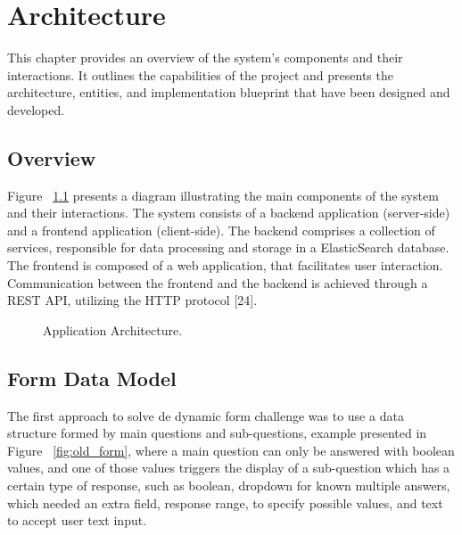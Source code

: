 %
%
\chapter{Architecture} \label{cap:architecture}

This chapter provides an overview of the system’s components and their interactions.
It outlines the capabilities of the project and presents the architecture, entities, and
implementation blueprint that have been designed and developed.

\section{Overview}

Figure ~\ref{fig:architecture} presents a diagram illustrating the main components of the system and their interactions. The system consists of a backend application (server-side) and a frontend application (client-side).
The backend comprises a collection of services, responsible for data processing and storage in a ElasticSearch database.
The frontend is composed of a web application, that facilitates user interaction. Communication between the frontend and the backend is achieved through a REST API, utilizing the HTTP protocol [24].

\begin{figure}[H]
	\begin{center}
	\end{center}
	\caption{Application Architecture.}\label{fig:architecture}
\end{figure}

\section{Form Data Model}

The first approach to solve de dynamic form challenge was to use a data structure formed by main questions and sub-questions, example presented in Figure ~\ref{fig:old_form}, where a main question can only be answered with boolean values, and one of those values triggers the display of a sub-question which has a certain type of response, such as boolean, dropdown for known multiple answers, which needed an extra field, response range, to specify possible values, and text to accept user text input.


